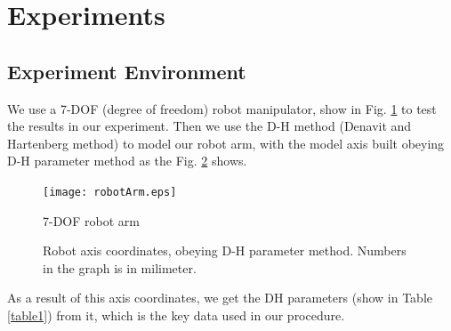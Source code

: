 \documentclass[letterpaper, 10 pt, conference]{ieeeconf}  %
\begin{document}
\section{Experiments}

\subsection{Experiment Environment}

We use a 7-DOF (degree of freedom) robot manipulator, show in Fig. \ref{robotGraph} to test the results in our experiment. Then we use the D-H method (Denavit and Hartenberg method) to model our robot arm, with the model axis built obeying D-H parameter method as the Fig. \ref{robotAxisGraph} shows.

   \begin{figure}[thpb]
      \centering
      \texttt{[image: robotArm.eps]}%
      \caption{7-DOF robot arm}
      \label{robotGraph}
   \end{figure}

   \begin{figure}[thpb]
      \centering
      \caption{Robot axis coordinates, obeying D-H parameter method. Numbers in the graph is in milimeter.}
      \label{robotAxisGraph}
   \end{figure}

As a result of this axis coordinates, we get the DH parameters  (show in Table \ref{table1}) from it, which is the key data used in our procedure.
\end{document}
